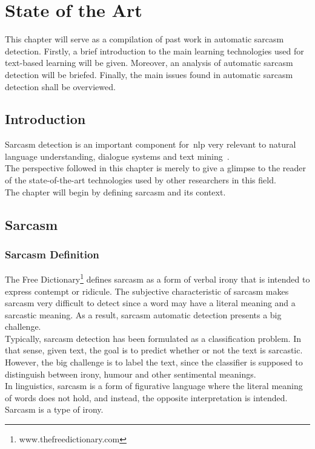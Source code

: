 \chapter{State of the Art}
\label{chap:enabling_technologies}
This chapter will serve as a compilation of past work in automatic sarcasm detection.
Firstly, a brief introduction to the main learning technologies used for text-based learning will be given. Moreover, an analysis of automatic sarcasm detection will be briefed. Finally, the main issues found in automatic sarcasm detection shall be overviewed.

\section{Introduction}
Sarcasm detection is an important component for~\ac{nlp} very relevant to natural language understanding, dialogue systems and text mining~\cite{khodak2017large}.\\ The perspective followed in this chapter is merely to give a glimpse to the reader of the state-of-the-art technologies used by other researchers in this field. \\
The chapter will begin by defining sarcasm and its context. 
\section{Sarcasm} 
\subsection{Sarcasm Definition~\cite{joshi2017automatic}}
The Free Dictionary\footnote{www.thefreedictionary.com} defines sarcasm as a form of verbal irony that is intended to express contempt or ridicule. The subjective characteristic of sarcasm makes sarcasm very difficult to detect since a word may have a literal meaning and a sarcastic meaning. As a result, sarcasm automatic detection presents a big challenge. \\
Typically, sarcasm detection has been formulated as a classification problem. In that sense, given text, the goal is to predict whether or not the text is sarcastic. However, the big challenge is to label the text, since the classifier is supposed to distinguish between irony,  humour and other sentimental meanings.\\
In linguistics, sarcasm is a form of figurative language where the literal meaning of words does not hold, and instead, the opposite interpretation is intended. Sarcasm is a type of irony. 

